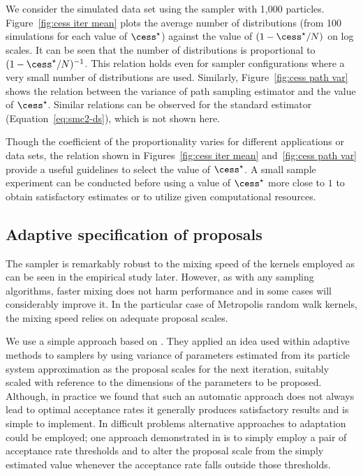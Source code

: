 We consider the simulated \pet data set using the \smc[2] sampler with 1,000
particles. Figure~\ref{fig:cess iter mean} plots the average number of
distributions (from 100 simulations for each value of $\cess^\star$) against the
value of $(1 - \cess^\star/N)$ on log scales. It can be seen that the number of
distributions is proportional to $(1 - \cess^\star/N)^{-1}$. This relation
holds even for sampler configurations where a very small number of
distributions are used. Similarly, Figure~\ref{fig:cess path var} shows the
relation between the variance of path sampling estimator and the value of
$\cess^\star$. Similar relations can be observed for the standard estimator
(Equation~\eqref{eq:smc2-ds}), which is not shown here.




Though the coefficient of the proportionality varies for different
applications or data sets, the relation shown in Figures~\ref{fig:cess iter
  mean} and~\ref{fig:cess path var} provide a useful guidelines to select the
value of $\cess^\star$. A small sample experiment can be conducted before
using a value of $\cess^\star$ more close to $1$ to obtain satisfactory
estimates or to utilize given computational resources.

\subsection{Adaptive specification of proposals}
\label{sub:Adaptive specification of proposals}

The \smc sampler is remarkably robust to the mixing speed of the \mcmc kernels
employed as can be seen in the empirical study later. However, as with any
sampling algorithms, faster mixing does not harm performance and in some cases
will considerably improve it. In the particular case of Metropolis random walk
kernels, the mixing speed relies on adequate proposal scales.

We use a simple approach based on \cite{Jasra:2010eh}. They applied an idea
used within adaptive \mcmc methods \cite{Andrieu:2006tw} to \smc samplers by
using variance of parameters estimated from its particle system approximation
as the proposal scales for the next iteration, suitably scaled with reference
to the dimensions of the parameters to be proposed. Although, in practice we
found that such an automatic approach does not always lead to optimal
acceptance rates it generally produces satisfactory results and is simple to
implement. In difficult problems alternative approaches to adaptation could be
employed; one approach demonstrated in \cite{Jasra:2010eh} is to simply employ
a pair of acceptance rate thresholds and to alter the proposal scale from the
simply estimated value whenever the acceptance rate falls outside those
thresholds.

